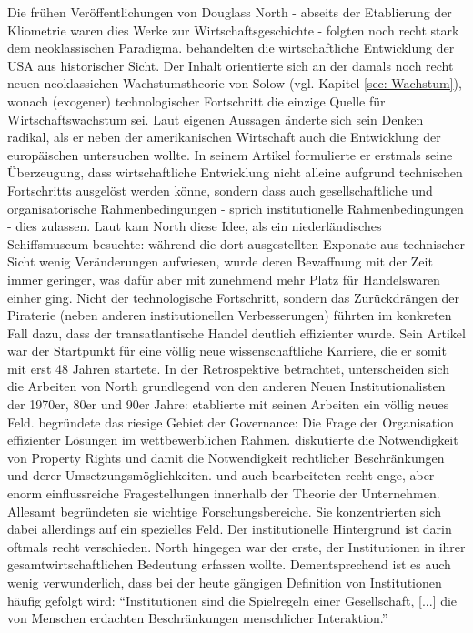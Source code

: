 Die frühen Veröffentlichungen von Douglass North - abseits der Etablierung der Kliometrie waren dies Werke zur Wirtschaftsgeschichte - folgten noch recht stark dem neoklassischen Paradigma. \textcite{North1961, North1966} behandelten die wirtschaftliche Entwicklung der USA aus historischer Sicht. Der Inhalt orientierte sich an der damals noch recht neuen neoklassichen Wachstumstheorie von Solow (vgl. Kapitel \ref{sec: Wachstum}), wonach (exogener) technologischer Fortschritt die einzige Quelle für Wirtschaftswachstum sei. Laut eigenen Aussagen \parencite{North1994b} änderte sich sein Denken radikal, als er neben der amerikanischen Wirtschaft auch die Entwicklung der europäischen untersuchen wollte. In seinem Artikel \textcite{North1968} formulierte er erstmals seine Überzeugung, dass wirtschaftliche Entwicklung nicht alleine aufgrund technischen Fortschritts ausgelöst werden könne, sondern dass auch gesellschaftliche und organisatorische Rahmenbedingungen - sprich institutionelle Rahmenbedingungen - dies zulassen. Laut \textcite{Menard2014} kam North diese Idee, als ein niederländisches Schiffsmuseum besuchte: während die dort ausgestellten Exponate aus technischer Sicht wenig Veränderungen aufwiesen, wurde deren Bewaffnung mit der Zeit immer geringer, was dafür aber mit zunehmend mehr Platz für Handelswaren einher ging. Nicht der technologische Fortschritt, sondern das Zurückdrängen der Piraterie (neben anderen institutionellen Verbesserungen) führten im konkreten Fall dazu, dass der transatlantische Handel deutlich effizienter wurde. Sein Artikel \textcite{North1968} war der Startpunkt für eine völlig neue wissenschaftliche Karriere, die er somit mit erst 48 Jahren startete.
In der Retrospektive betrachtet, unterscheiden sich die Arbeiten von North grundlegend von den anderen Neuen Institutionalisten der 1970er, 80er und 90er Jahre: \textcite{Coase1937, Coase1960} etablierte mit seinen Arbeiten ein völlig neues Feld. \textcite{Williamson1975} begründete das riesige Gebiet der Governance: Die Frage der Organisation effizienter Lösungen im wettbewerblichen Rahmen. \textcite{Demsetz1967} diskutierte die Notwendigkeit von Property Rights und damit die Notwendigkeit rechtlicher Beschränkungen und derer Umsetzungsmöglichkeiten. \textcite{Jensen1976} und auch \textcite{Alchian1972} bearbeiteten recht enge, aber enorm einflussreiche Fragestellungen innerhalb der Theorie der Unternehmen. Allesamt begründeten sie wichtige Forschungsbereiche. Sie konzentrierten sich dabei allerdings auf ein spezielles Feld. Der institutionelle Hintergrund ist darin oftmals recht verschieden. North hingegen war der erste, der Institutionen in ihrer gesamtwirtschaftlichen Bedeutung erfassen wollte. Dementsprechend ist es auch wenig verwunderlich, dass bei der heute gängigen Definition von Institutionen häufig \textcite[S. 3]{North1990} gefolgt wird: "`Institutionen sind die Spielregeln einer Gesellschaft, [...] die von Menschen erdachten Beschränkungen menschlicher Interaktion."'

